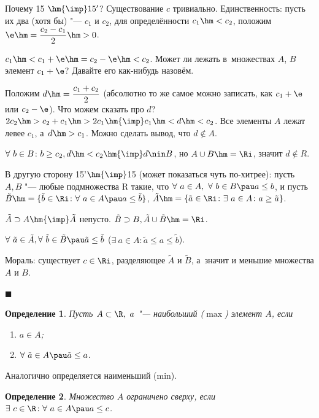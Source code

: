 \documentclass[a4paper,10pt,twoside]{article}
\newtheorem{Def}{Определение}[section]
\newenvironment{Proof}
       {\par\noindent{\textbf{Доказательство.}}}
       {\hfill$\scriptstyle\blacksquare$}
\begin{document}
\begin{Proof}
Почему 15 $\hm{\imp} 15'$? Существование $c$ тривиально. Единственность: пусть их два (хотя бы) "--- $c_1$ и $c_2$,
 для определённости $c_1\hm<c_2$, положим $\e\hm=\dfrac{c_2-c_1}{2}\hm>0$.

$c_1\hm<c_1+\e\hm=c_2-\e\hm<c_2$. Может ли лежать в~множествах $A$, $B$ элемент $c_1+\e$? Давайте его как-нибудь назовём.

Положим $d\hm=\dfrac{c_1+c_2}{2}$ (абсолютно то же самое можно записать, как  $c_1+\e$ или $c_2-\e$).
 Что можем сказать про $d$? $2c_2\hm>c_2+c_1\hm>2c_1 \hm{\imp} c_1\hm<d\hm<c_2$.
  Все элементы $A$ лежат левее $c_1$, а~$d\hm>c_1$. Можно сделать вывод, что $d\nin A$.

$\forall\  b\in B\colon b\geq c_2, d\hm<c_2\hm{\imp}  d\nin B$, но $A\cup B\hm=\Ri$, значит $d\nin R$.

В другую сторону 15'$\hm{\imp}$15 (может показаться чуть по-хитрее): пусть $A,B$ "--- любые
 подмножества $\mathrm R$ такие, что ${\forall\  a\in A},\ {\forall\  b\in B}\pau a\leq b$, и пусть
  $\tilde B\hm=\{\tilde b\in \Ri\colon \forall\  a\in A\pau a\leq\tilde b\}$, $\tilde A\hm=
  \{\tilde a\in \Ri\colon \exists\  a\in A\colon a\geq \tilde a\}$.

$\tilde A\supset A\hm{\imp} \tilde A$ непусто. $\tilde B\supset B, \tilde A\cup \tilde B\hm=\Ri$.

$\forall\  \tilde a\in \tilde A,\forall\  \tilde b\in \tilde B\pau \tilde a\leq \tilde b$ ($\exists\  a\in A\colon \tilde a\leq a\leq \tilde b$).

Мораль: существует $c\in \Ri$, разделяющее $\tilde A$ и $\tilde B$, а~значит и меньшие множества $A$ и $B$.



\end{Proof}
\begin{Def}
    Пусть $A\subset\R,\ a$ "--- наибольший ($\max$) элемент $A$, если

    \begin{enumerate}
        \item $a\in A$;

        \item $\forall\  \tilde a\in A\pau \tilde a\leq a$.
    \end{enumerate}
\end{Def}
 Аналогично определяется наименьший (min).

 \begin{Def}
    Множество $A$ ограничено сверху, если $\exists\  c\in \R\colon \forall\  a\in A\pau a\leq c$.
 \end{Def}
\end{document}
